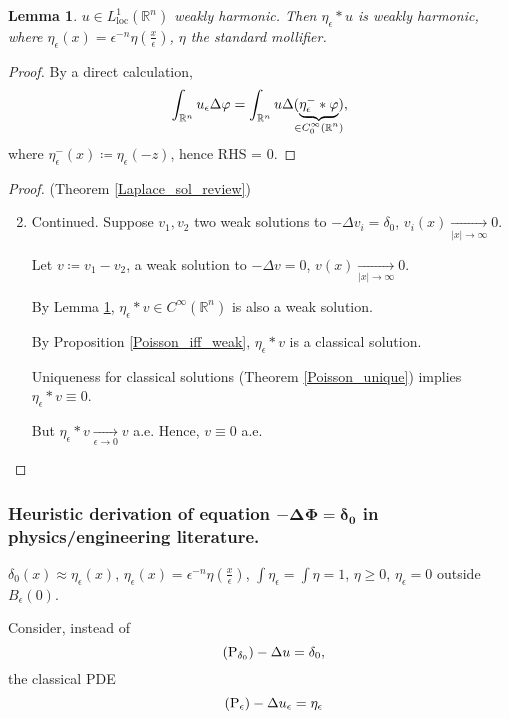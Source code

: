 \documentclass[12pt]{article}
\newtheorem{lemma}{Lemma}[section]
\theoremstyle{definition}
\begin{document}
\begin{lemma}\label{mollified_weak_harmonic}
$u\in L_{\text{loc}}^1(\mathbb{R}^n)$ weakly harmonic. Then $\eta_{\epsilon}*u$ is weakly harmonic, where $\eta_{\epsilon}(x)=\epsilon^{-n}\eta(\frac{x}{\epsilon})$, $\eta$ the standard mollifier.
\end{lemma}

\begin{proof}
By a direct calculation,
\[\int_{\mathbb{R}^n}u_{\epsilon}\Delta\varphi=\int_{\mathbb{R}^n}u\Delta(\underbrace{\eta_{\epsilon}^-*\varphi}_{\mathclap{\in C_0^{\infty}(\mathbb{R}^n)}}),\]
where $\eta_{\epsilon}^-(x)\coloneqq\eta_{\epsilon}(-z)$, hence RHS = 0.
\end{proof}

\begin{proof}
(Theorem \ref{Laplace_sol_review})
\begin{enumerate}[label=\alph*)]
\setcounter{enumi}{1}
\item Continued. Suppose $v_1,v_2$ two weak solutions to $-\Delta v_i=\delta_0$, $v_i(x)\xrightarrow[|x|\to\infty]{}0$.

Let $v\coloneqq v_1-v_2$, a weak solution to $-\Delta v=0$, $v(x)\xrightarrow[|x|\to\infty]{}0$.

By Lemma \ref{mollified_weak_harmonic}, $\eta_{\epsilon}*v\in C^{\infty}(\mathbb{R}^n)$ is also a weak solution.

By Proposition \ref{Poisson_iff_weak}, $\eta_{\epsilon}*v$ is a classical solution.

Uniqueness for classical solutions (Theorem \ref{Poisson_unique}) implies $\eta_{\epsilon}*v\equiv0$.

But $\eta_{\epsilon}*v\xrightarrow[\epsilon\to0]{}v$ a.e. Hence, $v\equiv0$ a.e.
\end{enumerate}
\end{proof}

\subsubsection*{Heuristic derivation of equation $\boldsymbol{-\Delta\Phi=\delta_0}$ in physics/engineering literature.}
$\delta_0(x)\approx\eta_{\epsilon}(x)$, $\eta_{\epsilon}(x)=\epsilon^{-n}\eta(\frac{x}{\epsilon})$, $\int\eta_{\epsilon}=\int\eta=1$, $\eta\geq0$, $\eta_{\epsilon}=0$ outside $B_{\epsilon}(0)$.

Consider, instead of
\begin{equation}\tag{P$_{\delta_0}$}\label{Poisson_Dirac_physics}
-\Delta u=\delta_0,
\end{equation}
the classical PDE
\begin{equation}\tag{P$_{\epsilon}$}\label{Poisson_mollified}
-\Delta u_{\epsilon}=\eta_{\epsilon}
\end{equation}
\end{document}

